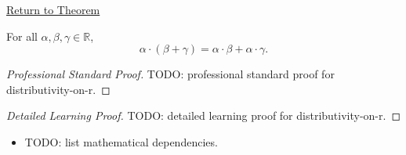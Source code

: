 \newpage
{}
\label{prf:distributivity-on-r}

\begin{remark*}[Return]
\hyperref[thm:distributivity-on-r]{Return to Theorem}
\end{remark*}

\begin{theorem*}[Distributivity on $R$]
For all $\alpha,\beta,\gamma\in\mathbb{R}$,
\[
\alpha\cdot(\beta+\gamma)=\alpha\cdot\beta+\alpha\cdot\gamma.
\]
\end{theorem*}

\begin{proof}[Professional Standard Proof]
\LRAProofBodyStart
TODO: professional standard proof for distributivity-on-r.
\end{proof}

\begin{proof}[Detailed Learning Proof]
\LRAProofBodyStart
TODO: detailed learning proof for distributivity-on-r.
\end{proof}

\begin{remark*}
\end{remark*}

\begin{dependencies}
\begin{itemize}
  \item TODO: list mathematical dependencies.
\end{itemize}
\end{dependencies}

\clearpage

